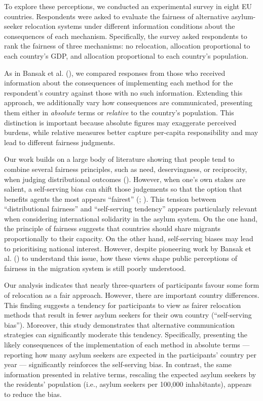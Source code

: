 \documentclass[
  12pt,
  a4paper,
]{article}
\begin{document}
To explore these perceptions, we conducted an experimental survey in eight EU countries. Respondents were asked to evaluate the fairness of alternative asylum-seeker relocation systems under different information conditions about the consequences of each mechanism. Specifically, the survey asked respondents to rank the fairness of three mechanisms: no relocation, allocation proportional to each country's GDP, and allocation proportional to each country's population.

As in Bansak et al. (), we compared responses from those who received information about the consequences of implementing each method for the respondent's country against those with no such information. Extending this approach, we additionally vary how consequences are communicated, presenting them either in \emph{absolute} terms or \emph{relative} to the country's population. This distinction is important because absolute figures may exaggerate perceived burdens, while relative measures better capture per-capita responsibility and may lead to different fairness judgments.

Our work builds on a large body of literature showing that people tend to combine several fairness principles, such as need, deservingness, or reciprocity, when judging distributional outcomes (). However, when one's own stakes are salient, a self-serving bias can shift those judgements so that the option that benefits agents the most appears ``fairest'' (; ). This tension between ``distributional fairness'' and ``self-serving tendency'' appears particularly relevant when considering international solidarity in the asylum system. On the one hand, the principle of fairness suggests that countries should share migrants proportionally to their capacity. On the other hand, self-serving biases may lead to prioritising national interest. However, despite pioneering work by Bansak et al. () to understand this issue, how these views shape public perceptions of fairness in the migration system is still poorly understood.

Our analysis indicates that nearly three-quarters of participants favour some form of relocation as a fair approach. However, there are important country differences. This finding suggests a tendency for participants to view as fairer relocation methods that result in fewer asylum seekers for their own country (``self-serving bias''). Moreover, this study demonstrates that alternative communication strategies can significantly moderate this tendency. Specifically, presenting the likely consequences of the implementation of each method in absolute terms --- reporting how many asylum seekers are expected in the participants' country per year --- significantly reinforces the self-serving bias. In contrast, the same information presented in relative terms, rescaling the expected asylum seekers by the residents' population (i.e., asylum seekers per 100,000 inhabitants), appears to reduce the bias.
\end{document}
